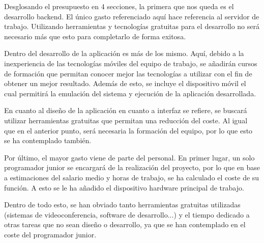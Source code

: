 Desglosando el presupuesto en 4 secciones, la primera que nos queda es el desarrollo backend. El único gasto referenciado aquí hace referencia al servidor de trabajo. Utilizando herramientas y tecnologías gratuitas para el desarrollo no será necesario más que esto para completarlo de forma exitosa. 

Dentro del desarrollo de la aplicación es más de los mismo. Aquí, debido a la inexperiencia de las tecnologías móviles del equipo de trabajo, se añadirán cursos de formación que permitan conocer mejor las tecnologías a utilizar con el fin de obtener un mejor resultado. Además de esto, se incluye el dispositivo móvil el cual permitirá la emulación del sistema y ejecución de la aplicación desarrollada.

En cuanto al diseño de la aplicación en cuanto a interfaz se refiere, se buscará utilizar herramientas gratuitas que permitan una reducción del coste. Al igual que en el anterior punto, será necesaria la formación del equipo, por lo que esto se ha contemplado también.

Por último, el mayor gasto viene de parte del personal. En primer lugar, un solo programador junior se encargará de la realización del proyecto, por lo que en base a estimaciones del salario medio \cite{glassdor-2021} y horas de trabajo, se ha calculado el coste de su función. A esto se le ha añadido el dispositivo hardware principal de trabajo. 

Dentro de todo esto, se han obviado tanto herramientas gratuitas utilizadas (sistemas de videoconferencia, software de desarrollo...) y el tiempo dedicado a otras tareas que no sean diseño o desarrollo, ya que se han contemplado en el coste del programador junior.



